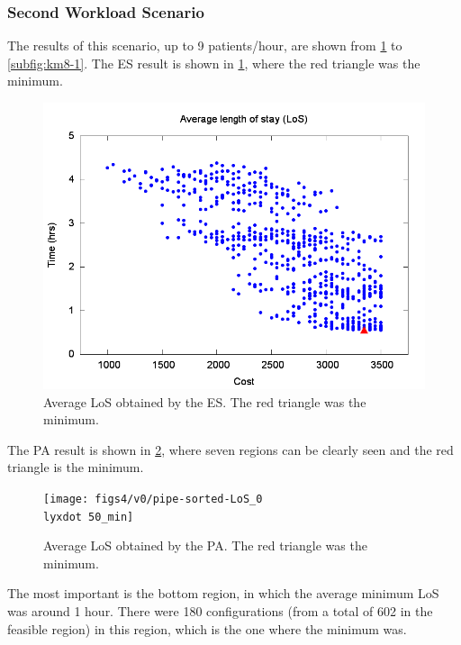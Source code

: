 \subsubsection{Second Workload Scenario}

The results of this scenario, up to 9 patients/hour, are shown from
\ref{subfig:es8-1} to \ref{subfig:km8-1}. The ES result is shown
in \ref{subfig:es8-1}, where the red triangle was the minimum. 
\begin{figure}[H]
\noindent \begin{centering}
\includegraphics[width=0.95\columnwidth,height=0.25\paperheight]{figs4/v0/6400-602-50-exh-LoS-min}
\par\end{centering}

\caption{Average LoS obtained by the ES. The red triangle was the minimum.
\label{subfig:es8-1}}
\end{figure}


The PA result is shown in \ref{subfig:pipe8-1}, where seven regions
can be clearly seen and the red triangle is the minimum.
\begin{figure}[H]
\noindent \begin{centering}
\texttt{[image: figs4/v0/pipe-sorted-LoS\_0\\lyxdot 50\_min]}
\par\end{centering}

\caption{Average LoS obtained by the PA. The red triangle was the minimum.
\label{subfig:pipe8-1}}
\end{figure}
 The most important is the bottom region, in which the average minimum
LoS was around 1 hour. There were 180 configurations (from a total
of 602 in the feasible region) in this region, which is the one where
the minimum was.

